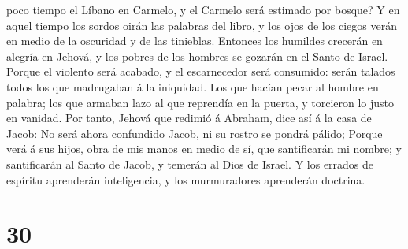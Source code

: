 poco tiempo el Líbano en Carmelo, y el Carmelo será estimado por bosque?
 Y en aquel tiempo los sordos oirán las palabras del libro,
y los ojos de los ciegos verán en medio de la oscuridad y de las
tinieblas.  Entonces los humildes crecerán en alegría en
Jehová, y los pobres de los hombres se gozarán en el Santo de Israel.
 Porque el violento será acabado, y el escarnecedor será
consumido: serán talados todos los que madrugaban á la iniquidad.
 Los que hacían pecar al hombre en palabra; los que armaban
lazo al que reprendía en la puerta, y torcieron lo justo en vanidad.
 Por tanto, Jehová que redimió á Abraham, dice así á la
casa de Jacob: No será ahora confundido Jacob, ni su rostro se pondrá
pálido;  Porque verá á sus hijos, obra de mis manos en
medio de sí, que santificarán mi nombre; y santificarán al Santo de
Jacob, y temerán al Dios de Israel.  Y los errados de
espíritu aprenderán inteligencia, y los murmuradores aprenderán
doctrina.

\hypertarget{section-29}{%
\section{30}\label{section-29}}


